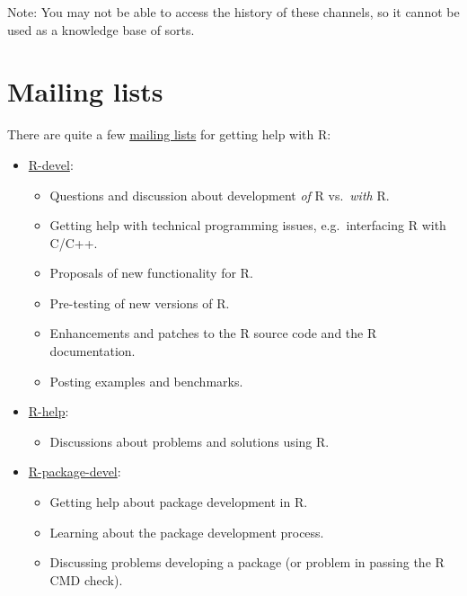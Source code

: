 \documentclass[
]{book}
\providecommand{\tightlist}{%
  \setlength{\itemsep}{0pt}\setlength{\parskip}{0pt}}
\begin{document}
Note: You may not be able to access the history of these channels, so it cannot be used as a knowledge base of sorts.

\hypertarget{mailing-lists}{%
\section{Mailing lists}\label{mailing-lists}}

There are quite a few \href{https://www.r-project.org/mail.html}{mailing lists} for getting help with R:

\begin{itemize}
\tightlist
\item
  \href{https://stat.ethz.ch/mailman/listinfo/r-devel}{R-devel}:

  \begin{itemize}
  \tightlist
  \item
    Questions and discussion about development \emph{of} R vs.~\emph{with} R.
  \item
    Getting help with technical programming issues, e.g.~interfacing R with C/C++.
  \item
    Proposals of new functionality for R.
  \item
    Pre-testing of new versions of R.
  \item
    Enhancements and patches to the R source code and the R documentation.
  \item
    Posting examples and benchmarks.
  \end{itemize}
\item
  \href{https://stat.ethz.ch/mailman/listinfo/r-help}{R-help}:

  \begin{itemize}
  \tightlist
  \item
    Discussions about problems and solutions using R.
  \end{itemize}
\item
  \href{https://stat.ethz.ch/mailman/listinfo/r-package-devel}{R-package-devel}:

  \begin{itemize}
  \tightlist
  \item
    Getting help about package development in R.
  \item
    Learning about the package development process.
  \item
    Discussing problems developing a package (or problem in passing the R CMD check).
  \end{itemize}
\end{itemize}
\end{document}
